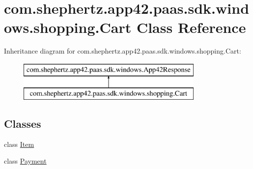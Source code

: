 \hypertarget{classcom_1_1shephertz_1_1app42_1_1paas_1_1sdk_1_1windows_1_1shopping_1_1_cart}{\section{com.\+shephertz.\+app42.\+paas.\+sdk.\+windows.\+shopping.\+Cart Class Reference}
\label{classcom_1_1shephertz_1_1app42_1_1paas_1_1sdk_1_1windows_1_1shopping_1_1_cart}
}
Inheritance diagram for com.\+shephertz.\+app42.\+paas.\+sdk.\+windows.\+shopping.\+Cart\+:\begin{figure}[H]
\begin{center}
\leavevmode
\includegraphics[height=2.000000cm]{classcom_1_1shephertz_1_1app42_1_1paas_1_1sdk_1_1windows_1_1shopping_1_1_cart}
\end{center}
\end{figure}
\subsection*{Classes}
\begin{DoxyCompactItemize}
\item 
class \hyperlink{classcom_1_1shephertz_1_1app42_1_1paas_1_1sdk_1_1windows_1_1shopping_1_1_cart_1_1_item}{Item}
\item 
class \hyperlink{classcom_1_1shephertz_1_1app42_1_1paas_1_1sdk_1_1windows_1_1shopping_1_1_cart_1_1_payment}{Payment}
\end{DoxyCompactItemize}
